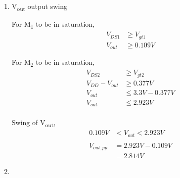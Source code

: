 \documentclass{article}
\begin{document}
\begin{enumerate}
\item V\textsubscript{out} output swing

For M\textsubscript{1} to be in saturation,
\begin{equation*}
\begin{aligned}
V_{DS1} &\geq V_{gt1}\\
V_{out} &\geq 0.109 V
\end{aligned}
\end{equation*}

For M\textsubscript{2} to be in saturation,
\begin{equation*}
\begin{aligned}
V_{DS2} &\geq V_{gt2} \\
V_{DD} - V_{out} &\geq 0.377 V \\
V_{out} &\leq 3.3 V - 0.377 V \\
V_{out} &\leq 2.923 V \\
\end{aligned}
\end{equation*}

Swing of V\textsubscript{out},
\begin{equation*}
\begin{aligned}
0.109 V &< V_{out} < 2.923 V \\
\\
V_{out, pp} &= 2.923 V - 0.109 V \\
&= 2.814 V
\end{aligned}
\end{equation*}

\item 
\end{enumerate}
\end{document}
